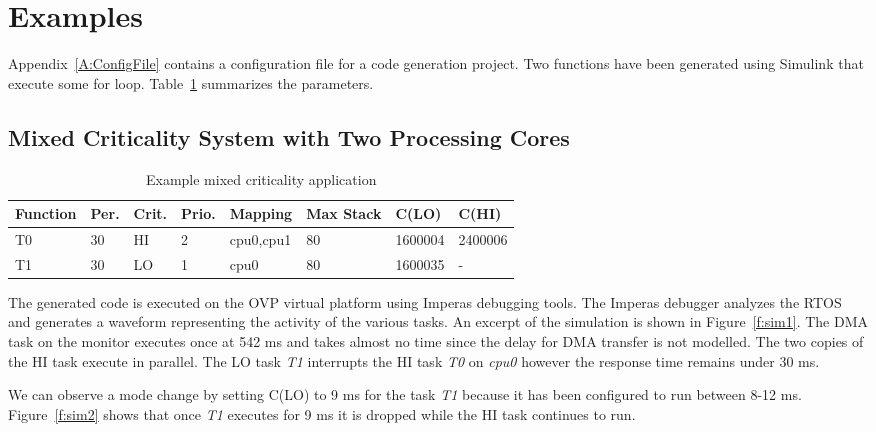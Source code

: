 \section{Examples}
\label{s:examples} 

	Appendix~\ref{A:ConfigFile} contains a configuration file for a code generation project. 
	Two functions have been generated using Simulink that execute some for loop. Table~\ref{t:config} summarizes the parameters.
	
	
\subsection{Mixed Criticality System with Two Processing Cores}	

\begin{table}[h]
\caption{Example mixed criticality application}
\centering

	\begin{tabular}{@{}llllllll@{}}
	Function & Per. & Crit. & Prio. & Mapping & Max Stack & C(LO) & C(HI) 	 \\
	
	\toprule
	T0 & 30 & HI & 2 & cpu0,cpu1 & 80 & 1600004 & 2400006 \\
	T1 & 30 & LO & 1 & cpu0 & 80 & 1600035 & - \\
	\end{tabular}

\label{t:config}
\end{table}
	

	The generated code is executed on the OVP virtual platform using Imperas debugging tools. The Imperas debugger analyzes the RTOS and generates a waveform representing the activity of the various tasks. 
	An excerpt of the simulation is shown in Figure~\ref{f:sim1}.
	The DMA task on the monitor executes once at 542 ms and takes almost no time since the delay for DMA transfer is not modelled.
	The two copies of the HI task execute in parallel. The LO task \emph{T1} interrupts the HI task \emph{T0} on \emph{cpu0} however the response time remains under 30 ms.

	We can observe a mode change by setting C(LO) to 9 ms for the task \emph{T1} because it has been configured to run between 8-12 ms. 
	Figure~\ref{f:sim2} shows that once \emph{T1} executes for 9 ms it is dropped while the HI task continues to run.
	 
		
